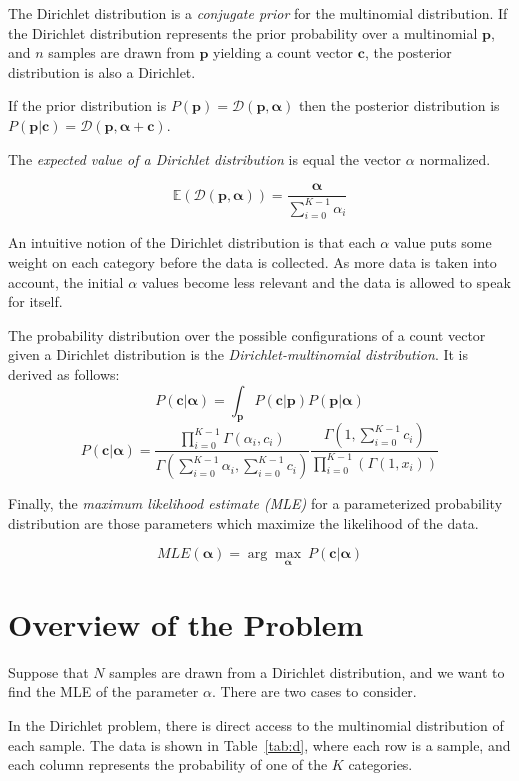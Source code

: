 \documentclass[twoside]{article}
\begin{document}
The Dirichlet distribution is a \textit{conjugate prior} for the multinomial distribution.  If the Dirichlet distribution represents the prior probability over a multinomial \(\mathbf{p}\), and $n$ samples are drawn from \(\mathbf{p}\) yielding a count vector \(\mathbf{c}\), the posterior distribution is also a Dirichlet.

If the prior distribution is $P(\mathbf{p})=\mathcal{D}(\mathbf{p},\mathbf{\alpha})$ then the posterior distribution is $P(\mathbf{p} | \mathbf{c})=\mathcal{D}(\mathbf{p},\mathbf{\alpha} + \mathbf{c})$.

The \textit{expected value of a Dirichlet distribution} is equal the vector $\alpha$ normalized.

\[\mathbb{E}(\mathcal{D}(\mathbf{p},\mathbf{\alpha}))=\frac{\mathbf{\alpha}}{\sum_{i=0}^{K-1}\alpha_i}\]

An intuitive notion of the Dirichlet distribution is that each $\alpha$ value puts some weight on each category before the data is collected.  As more data is taken into account, the initial $\alpha$ values become less relevant and the data is allowed to speak for itself.

The probability distribution over the possible configurations of a count vector given a Dirichlet distribution is the \textit{Dirichlet-multinomial distribution}.  It is derived as follows:
\[P(\mathbf{c}|\mathbf{\alpha})=\int_{\mathbf{p}}P(\mathbf{c}|\mathbf{p})P(\mathbf{p}|\mathbf{\alpha})\]
\[P(\mathbf{c}|\mathbf{\alpha})=
\frac{\prod_{i=0}^{K-1}\Gamma(\alpha_i,c_i)}{\Gamma\left(\sum_{i=0}^{K-1}\alpha_i,\sum_{i=0}^{K-1}c_i\right)}
\frac{\Gamma\left(1,\sum_{i=0}^{K-1}c_i\right)}{\prod_{i=0}^{K-1}\left(\Gamma(1,x_i)\right)}
\]

Finally, the \textit{maximum likelihood estimate (MLE)} for a parameterized probability distribution are those parameters which maximize the likelihood of the data.

\[MLE(\mathbf{\alpha})=\arg\max_\mathbf{\alpha}\ P(\mathbf{c}|\mathbf{\alpha})\]

\section{Overview of the Problem}

Suppose that $N$ samples are drawn from a Dirichlet distribution, and we want to find the MLE of the parameter $\alpha$.  There are two cases to consider.

In the Dirichlet problem, there is direct access to the multinomial distribution of each sample.  The data is shown in Table~\ref{tab:d}, where each row is a sample, and each column represents the probability of one of the $K$ categories.
\end{document}

